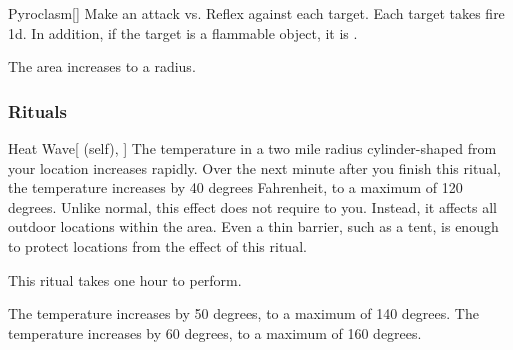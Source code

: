 \lowercase{\hypertarget{spell:Pyroclasm}{}}\label{spell:Pyroclasm}
\begin{freeability}[Rank 5]{\hypertarget{spell:Pyroclasm}{Pyroclasm}}[]
Make an attack vs. Reflex against each target.
\hit Each target takes fire  \minus1d.
In addition, if the target is a flammable object, it is .

\rankline
{} The area increases to a \arealarge radius.
\end{freeability}
\vspace{0.25em}



\subsubsection{Rituals}


\lowercase{\hypertarget{spell:Heat Wave}{}}\label{spell:Heat Wave}
\begin{attuneability}[Rank 4]{\hypertarget{spell:Heat Wave}{Heat Wave}}[ (self), ]
\targetrule
The temperature in a two mile radius cylinder-shaped  from your location increases rapidly.
Over the next minute after you finish this ritual, the temperature increases by 40 degrees Fahrenheit, to a maximum of 120 degrees.
Unlike normal, this effect does not require  to you.
Instead, it affects all outdoor locations within the area.
Even a thin barrier, such as a tent, is enough to protect locations from the effect of this ritual.

This ritual takes one hour to perform.

\rankline
{} The temperature increases by 50 degrees, to a maximum of 140 degrees.
 The temperature increases by 60 degrees, to a maximum of 160 degrees.
\end{attuneability}
\vspace{0.25em}


